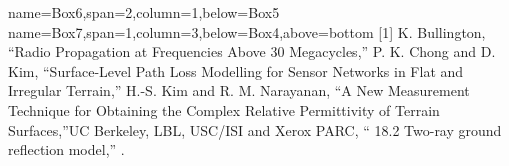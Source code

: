 \documentclass[a0paper,landscape]{baposter}
\begin{document}
\begin{poster}
{}




{name=Box6,span=2,column=1,below=Box5}{
}
{name=Box7,span=1,column=3,below=Box4,above=bottom}{
[1] K. Bullington, “Radio Propagation at Frequencies Above 30 Megacycles,” \newline
[2] P. K. Chong and D. Kim, “Surface-Level Path Loss Modelling for Sensor Networks in Flat and Irregular Terrain,” \newline
[3] H.-S. Kim and R. M. Narayanan, “A New Measurement Technique for Obtaining the Complex Relative Permittivity of Terrain Surfaces,”\newline
[4] UC Berkeley, LBL, USC/ISI and Xerox PARC, “ 18.2 Two-ray ground reflection model,” .
}



\end{poster}
\end{document}

